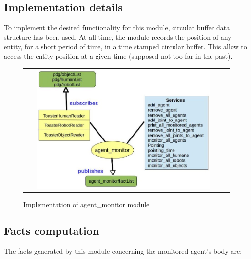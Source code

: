 \documentclass[a4paper]{article}
\begin{document}
\subsection{Implementation details}
To implement the desired functionality for this module, circular buffer data structure has been used. At all time, the module records the position of any entity, for a short period of time, in a time stamped circular buffer. This allow to access the entity position at a given time (supposed not too far in the past).

 \begin{figure}[ht!]
 \centering
 \begin{tabular}{cc}
  \includegraphics[width=0.90\textwidth]{img/agentMonitor.jpg}
 \end{tabular}
 \caption{Implementation of agent\_monitor
 module}
 \label{fig:agentMonitor}
 \end{figure}
 
 
\subsection{Facts computation}

The facts generated by this module concerning the monitored agent's body are:
\end{document}

